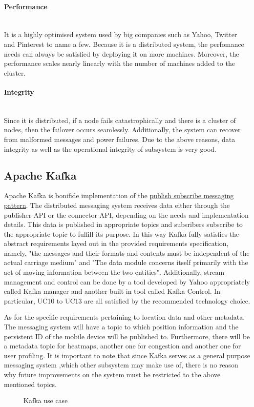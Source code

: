 \paragraph{Performance}
\mbox{}\\
It is a highly optimised system used by big companies such as Yahoo, Twitter and Pinterest to name a few. Because it is a distributed system, the perfomance needs can always be satisfied by deploying it on more machines. Moreover, the performance scales nearly linearly with the number of machines added to the cluster.
\paragraph{Integrity}
\mbox{}\\
Since it is distributed, if a node fails catastrophically and there is a cluster of nodes, then the failover occurs seamlessly. Additionally, the system can recover from malformed messages and power failures. Due to the above reasons, data integrity as well as the operational integrity of subsystem is very good.

\subsection{Apache Kafka}
Apache Kafka is bonifide implementation of the \underline{publish subscribe messaging pattern}.
The distributed messaging system receives data either through the publisher API or the connector API, depending on the needs and implementation details. This data is published in appropriate topics and subsribers subscribe to the appropriate topic to fulfill its purpose. In this way Kafka fully satisfies the abstract requirements layed out in the provided requirements specification, namely, "the messages and their formats and contents must be independent of the actual carriage medium" and "The data module concerns itself primarily with the act of moving information between the two entities". Additionally, stream management and control can be done by a tool developed by Yahoo appropriately called Kafka manager and another built in tool called Kafka Control. In particular, UC10 to UC13 are all satisfied by the recommended technology choice.\par
\bigskip
\noindent
As for the specific requirements pertaining to location data and other metadata. The messaging system will have a topic to which position information and the persistent ID of the mobile device will be published to. Furthermore, there will be a metadata topic for heatmaps, another one for congestion and another one for user profiling.
It is important to note that since Kafka serves as a general purpose messaging system ,which other subsystem may make use of, there is no reason why future improvements on the system must be restricted to the above mentioned topics.
\begin{figure}[h]
\caption{Kafka use case}
\end{figure}
